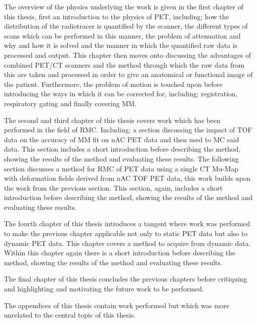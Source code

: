         The overview of the physics underlying the work is given in the first chapter of this thesis, first an introduction to the physics of \gls{PET}, including; how the distribution of the radiotracer is quantified by the scanner, the different types of scans which can be performed in this manner, the problem of attenuation and why and how it is solved and the manner in which the quantified raw data is processed and output. This chapter then moves onto discussing the advantages of combined \gls{PET}/\gls{CT} scanners and the method through which the raw data from this are taken and processed in order to give an anatomical or functional image of the patient. Furthermore, the problem of motion is touched upon before introducing the ways in which it can be corrected for, including; registration, respiratory gating and finally covering \gls{MM}.
        
        The second and third chapter of this thesis covers work which has been performed in the field of \gls{RMC}. Including; a section discussing the impact of \gls{TOF} data on the accuracy of \gls{MM} fit on \gls{nAC} \gls{PET} data and then used to \gls{MC} said data. This section includes a short introduction before describing the method, showing the results of the method and evaluating these results. The following section discusses a method for \gls{RMC} of \gls{PET} data using a single \gls{CT} \gls{Mu-Map} with deformation fields derived from \gls{nAC} \gls{TOF} \gls{PET} data, this work builds upon the work from the previous section. This section, again, includes a short introduction before describing the method, showing the results of the method and evaluating these results.
        
        The fourth chapter of this thesis introduces a tangent where work was performed to make the previous chapter applicable not only to static \gls{PET} data but also to dynamic \gls{PET} data. This chapter covers a method to acquire  from dynamic data.%
        Within this chapter again there is a short introduction before describing the method, showing the results of the method and evaluating these results.
        
        The final chapter of this thesis concludes the previous chapters before critiquing and highlighting and motivating the future work to be performed.

        The appendices of this thesis contain work performed but which was more unrelated to the central topic of this thesis.
